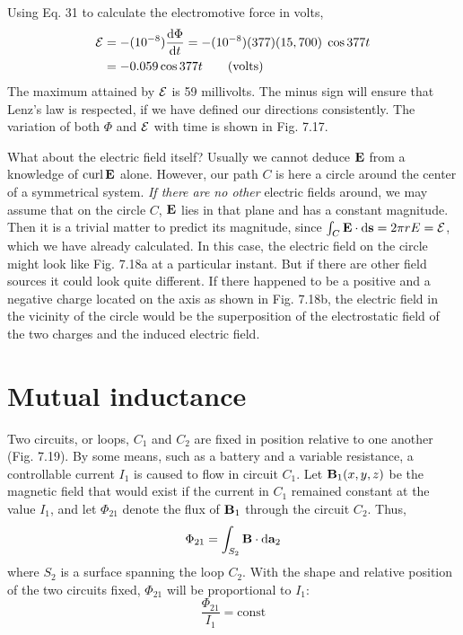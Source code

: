Using Eq. 31 to calculate the electromotive force in volts,
\begin{align}
  \mathcal{E} &= -(10^{-8})\frac{\textup{d}\Phi}{\textup{d} t} = -(10^{-8})(377)(15,700)\;\cos 377 t \\
       &= -0.059\cos 377 t \qquad \text{(volts)}
\end{align}
The maximum attained by $\mathcal{E}$ is 59 millivolts. The minus sign will
ensure that Lenz's law is respected, if we have defined our directions
consistently. The variation of both $\Phi$ and $\mathcal{E}$ with time is shown in
Fig. 7.17.

What about the electric field itself? Usually we cannot deduce
$\mathbf{E}$ from a knowledge of $\operatorname{curl}\mathbf{E}$ alone. However, our path $C$ is here a
circle around the center of a symmetrical system. \emph{If there are no
other} electric fields around, we may assume that on the circle $C$, $\mathbf{E}$ lies
in that plane and has a constant magnitude. Then it is a trivial
matter to predict its magnitude, since $\int_C \mathbf{E}\cdot\textup{d}\mathbf{s} = 2\pi r E = \mathcal{E}$, which
we have already calculated. In this case, the electric field on the
circle might look like Fig. 7.18a at a particular instant. But if there
are other field sources it could look quite different. If there happened
to be a positive and a negative charge located on the axis as shown
in Fig. 7.18b, the electric field in the vicinity of the circle would be
the superposition of the electrostatic field of the two charges and the
induced electric field.


\section{Mutual inductance}

Two circuits, or loops, $C_1$ and $C_2$ are fixed in position relative to
one another (Fig. 7.19). By some means, such as a battery and
a variable resistance, a controllable current $I_1$ is caused to flow in
circuit $C_1$. Let $\mathbf{B}_1(x,y,z)$ be the magnetic field that would exist if
the current in $C_1$ remained constant at the value $I_1$, and let $\Phi_{21}$ denote
the flux of $\mathbf{B}_1$ through the circuit $C_2$. Thus,
\begin{equation}
  \Phi_{21} = \int_{S_2} \mathbf{B}\cdot\textup{d}\mathbf{a}_2
\end{equation}
where $S_2$ is a surface spanning the loop $C_2$. With the shape and
relative position of the two circuits fixed, $\Phi_{21}$ will be proportional
to $I_1$:
\begin{equation}
  \frac{\Phi_{21}}{I_1} = \text{const}
\end{equation}

